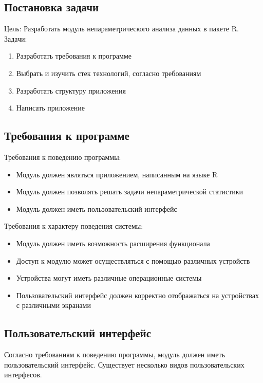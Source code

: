 \documentclass[14pt,a4paper]{scrartcl}
\begin{document}
    \subsection{Постановка задачи}
    \noindent Цель: Разработать модуль непараметрического анализа данных в пакете R.
	\noindent Задачи:
    \begin{enumerate}
        \item Разработать требования к программе
        \item Выбрать и изучить стек технологий, согласно требованиям
        \item Разработать структуру приложения
        \item Написать приложение
    \end{enumerate}

    \subsection{Требования к программе}
    Требования к поведению программы:
    \begin{itemize}
        \item Модуль должен являться приложением, написанным на языке R
        \item Модуль должен позволять решать задачи непараметрической статистики
        \item Модуль должен иметь пользовательский интерфейс
    \end{itemize}

    Требования к характеру поведения системы:
    \begin{itemize}
        \item Модуль должен иметь возможность расширения функционала
        \item Доступ к модулю может осуществляться с помощью различных устройств
        \item Устройства могут иметь различные операционные системы
        \item Пользовательский интерфейс должен корректно отображаться на устройствах с различными экранами
    \end{itemize}

    \subsection{Пользовательский интерфейс}
    Согласно требованиям к поведению программы, модуль должен иметь пользовательский интерфейс.
    Существует несколько видов пользовательских интерфесов.
\end{document}
